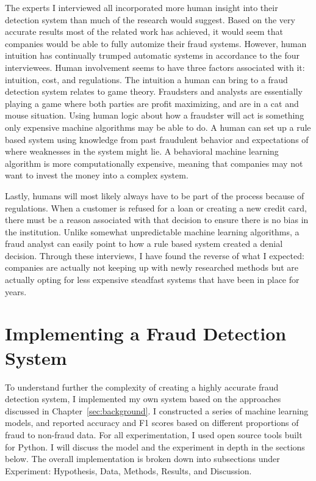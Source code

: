 \documentclass[midd]{thesis}
\begin{document}
The experts I interviewed all incorporated more human insight into their detection system than much of the research would suggest. Based on the very accurate results most of the related work has achieved, it would seem that companies would be able to fully automize their fraud systems. However, human intuition has continually trumped automatic systems in accordance to the four interviewees. Human involvement seems to have three factors associated with it: intuition, cost, and regulations. The intuition a human can bring to a fraud detection system relates to game theory. Fraudsters and analysts are essentially playing a game where both parties are profit maximizing, and are in a cat and mouse situation. Using human logic about how a fraudster will act is something only expensive machine algorithms may be able to do. A human can set up a rule based system using knowledge from past fraudulent behavior and expectations of where weaknesses in the system might lie. A behavioral machine learning algorithm is more computationally expensive, meaning that companies may not want to invest the money into a complex system. 

Lastly, humans will most likely always have to be part of the process because of regulations. When a customer is refused for a loan or creating a new credit card, there must be a reason associated with that decision to ensure there is no bias in the institution. Unlike somewhat unpredictable machine learning algorithms, a fraud analyst can easily point to how a rule based system created a denial decision. Through these interviews, I have found the reverse of what I expected: companies are actually not keeping up with newly researched methods but are actually opting for less expensive steadfast systems that have been in place for years. 


\pagebreak
\chapter{Implementing a Fraud Detection System}
\label{sec:impl}


To understand further the complexity of creating a highly accurate fraud detection system, I implemented my own system based on the approaches discussed in Chapter~\ref{sec:background}. I constructed a series of machine learning models, and reported accuracy and F1 scores based on different proportions of fraud to non-fraud data. For all experimentation, I used open source tools built for Python. I will discuss the model and the experiment in depth in the sections below. The overall implementation is broken down into subsections under Experiment: Hypothesis, Data, Methods, Results, and Discussion. 
\end{document}
